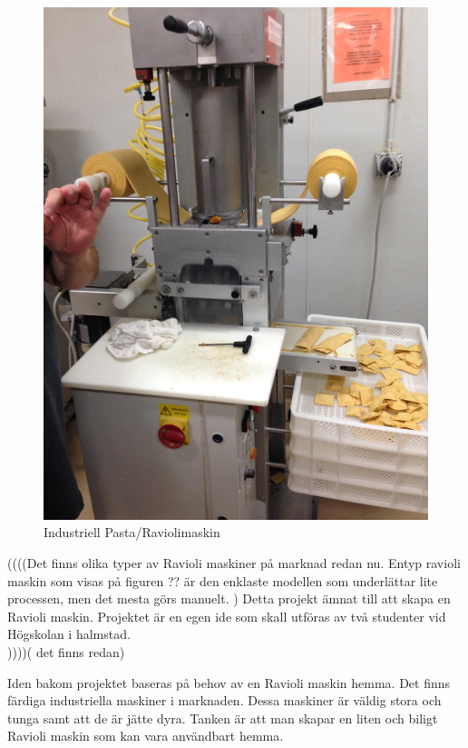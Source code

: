  		\begin{figure}[h]
 			\begin{center}
 				\includegraphics[scale=0.5]{images/ravioli_maskin.png}
 				\caption{Industriell Pasta/Raviolimaskin}
 				\label{pastamaskin}	
 			\end{center}
 		\end{figure}
		

((((Det finns olika typer av Ravioli maskiner på marknad redan nu. Entyp ravioli maskin som visas på figuren ?? är den enklaste modellen som underlättar lite processen, men det mesta görs manuelt. )
Detta projekt  ämnat till att skapa en Ravioli maskin. Projektet är en egen ide som skall utföras av två studenter vid Högskolan i halmstad.\\ ))))( det finns redan)


Iden bakom projektet baseras på behov av en Ravioli maskin hemma.
Det finns färdiga industriella maskiner i marknaden. Dessa maskiner är väldig stora och tunga samt att de är jätte dyra. 
Tanken är att man skapar en liten och biligt Ravioli maskin som kan vara användbart hemma.		
